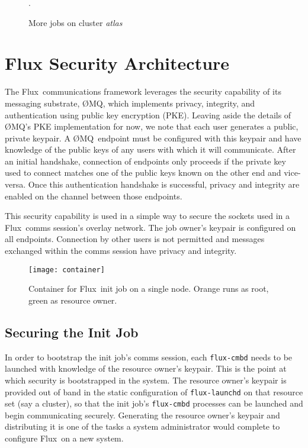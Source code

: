 \documentclass[10pt]{article}
\newcommand{\flux}{Flux}
\newcommand{\zMQ}{\O{}MQ}
\begin{document}
\begin{figure}
\centering
{}
\qquad
{}
\label{fig:launchjob}
\caption{More jobs on cluster {\em atlas}}.
\end{figure}

\section{Flux Security Architecture}
\label{sec:security}

The \flux\ communications framework leverages the security capability of
its messaging substrate, \zMQ\cite{ZMQGuide}, which implements privacy,
integrity, and authentication using public key encryption (PKE).
Leaving aside the details of \zMQ's PKE implementation for now,
we note that each user generates a public, private keypair.
A \zMQ\ endpoint must be configured with this keypair and have knowledge
of the public keys of any users with which it will communicate.
After an initial handshake, connection of endpoints only proceeds
if the private key used to connect matches one of the public
keys known on the other end and vice-versa.  Once this authentication
handshake is successful, privacy and integrity are enabled on the channel
between those endpoints.

This security capability is used in a simple way to secure the sockets
used in a \flux\ comms session's overlay network.  The job owner's
keypair is configured on all endpoints.  Connection by other users
is not permitted and messages exchanged within the comms session have
privacy and integrity.

\begin{figure}
\centering
  \texttt{[image: container]}
\label{fig:container}
\caption{Container for \flux\ init job on a single node.
Orange runs as root, green as resource owner.}
\end{figure}

\subsection{Securing the Init Job}

In order to bootstrap the init job's comms session, each {\tt flux-cmbd}
needs to be launched with knowledge of the resource owner's keypair.
This is the point at which security is bootstrapped in the system.
The resource owner's keypair is provided out of band in the
static configuration of {\tt flux-launchd} on that resource set
(say a cluster), so that the init job's {\tt flux-cmbd} processes can be
launched and begin communicating securely.  Generating the resource
owner's keypair and distributing it is one of the tasks a
system administrator would complete to configure \flux\ on a new system.
\end{document}
